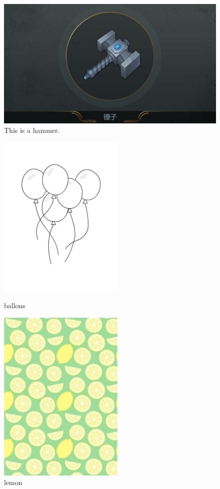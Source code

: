 \documentclass{mcmthesis} %
\begin{document}
\begin{figure}[ht]
\centering
\includegraphics[scale = .35]{images/hammer.jpg}
\caption{This is a hammer.}
\label{fig:fig1} %
\end{figure}

\begin{figure}[htbp]
	\centering
	\begin{minipage}[ht]{0.48\textwidth}
		\centering
		\includegraphics[width=6cm]{images/ballons}%
		\label{fig:fig_22}
		\caption{ballons}
	\end{minipage}
	\begin{minipage}[ht]{0.48\textwidth}
		\centering
		\includegraphics[width=6cm]{images/lemon}
		\caption{lemon}
		\label{fig:fig_23}
	\end{minipage}
\end{figure}
\end{document}

